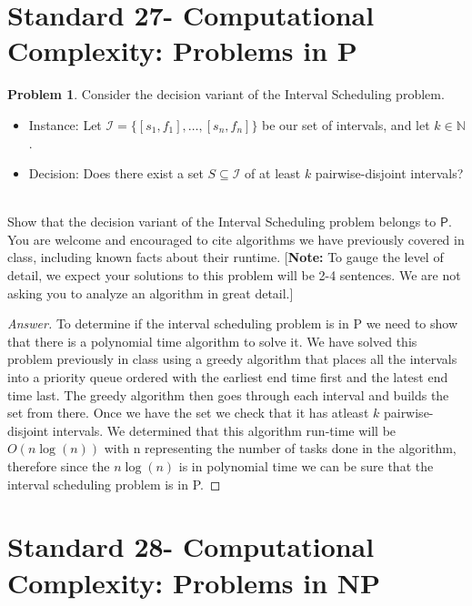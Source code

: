 \documentclass[11pt]{article}
\theoremstyle{definition}
\theoremstyle{definition}
\newtheorem{required}{Problem}
\theoremstyle{definition}
\begin{document}
\newpage
\section{Standard 27- Computational Complexity: Problems in \textsf{P}}

\begin{required}
Consider the decision variant of the \textsf{Interval Scheduling} problem.
\begin{itemize}
\item \textsf{Instance:} Let $\mathcal{I} = \{ [s_{1}, f_{1}], \ldots, [s_{n}, f_{n}] \}$ be our set of intervals, and let $k \in \mathbb{N}$.

\item \textsf{Decision:} Does there exist a set $S \subseteq \mathcal{I}$ of at least $k$ pairwise-disjoint intervals?
\end{itemize}


\noindent \\ Show that the decision variant of the \textsf{Interval Scheduling} problem belongs to $\textsf{P}$. You are welcome and encouraged to cite algorithms we have previously covered in class, including known facts about their runtime. [\textbf{Note:} To gauge the level of detail, we expect your solutions to this problem will be 2-4 sentences. We are not asking you to analyze an algorithm in great detail.]
\end{required}


\begin{proof}[Answer]

To determine if the interval scheduling problem is in P we need to show that there is a polynomial time algorithm to solve it. We have solved this problem previously in class using a greedy algorithm that places all the intervals into a priority queue ordered with the earliest end time first and the latest end time last. The greedy algorithm then goes through each interval and builds the set from there. Once we have the set we check that it has atleast $k$ pairwise-disjoint intervals. We determined that this algorithm run-time will be $O(n\log(n))$ with n representing the number of tasks done in the algorithm, therefore since the $n\log(n)$ is in polynomial time we can be sure that the interval scheduling problem is in P.
\end{proof}







\newpage
\section{Standard 28- Computational Complexity: Problems in \textsf{NP}}
\end{document}
